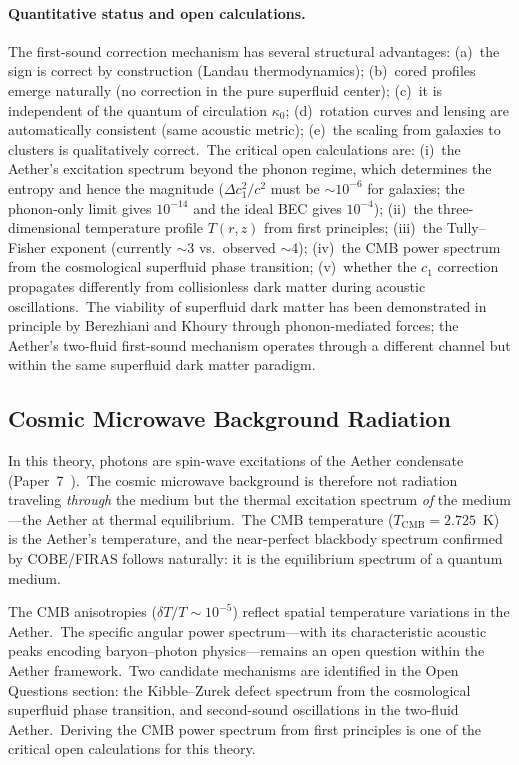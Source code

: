 ﻿\documentclass[12pt,letterpaper]{article}
\begin{document}
\paragraph{Quantitative status and open calculations.}
The first-sound correction mechanism has several structural advantages:
(a)~the sign is correct by construction (Landau thermodynamics);
(b)~cored profiles emerge naturally (no correction in the pure superfluid
center); (c)~it is independent of the quantum of circulation $\kappa_0$;
(d)~rotation curves and lensing are automatically consistent (same
acoustic metric); (e)~the scaling from galaxies to clusters is
qualitatively correct.\ The critical open calculations are:
(i)~the Aether's excitation spectrum beyond the phonon regime, which
determines the entropy and hence the magnitude ($\Delta c_1^2/c^2$ must
be $\sim$$10^{-6}$ for galaxies; the phonon-only limit gives
$10^{-14}$ and the ideal BEC gives $10^{-4}$);
(ii)~the three-dimensional temperature profile $T(r,z)$ from first
principles; (iii)~the Tully--Fisher exponent (currently $\sim$3 vs.\
observed $\sim$4); (iv)~the CMB power spectrum from the cosmological
superfluid phase transition; (v)~whether the $c_1$ correction propagates
differently from collisionless dark matter during acoustic oscillations.\
The viability of superfluid dark matter has been demonstrated in
principle by Berezhiani and Khoury \cite{berezhiani2015} through
phonon-mediated forces; the Aether's two-fluid first-sound mechanism
operates through a different channel but within the same superfluid
dark matter paradigm.


\subsection{Cosmic Microwave Background Radiation}

In this theory, photons are spin-wave excitations of the Aether condensate
(Paper~7~\cite{otto-quantum}).\ The cosmic microwave background is therefore
not radiation traveling \emph{through} the medium but the thermal excitation
spectrum \emph{of} the medium---the Aether at thermal equilibrium.\ The CMB
temperature ($T_{\mathrm{CMB}} = 2.725$~K) is the Aether's temperature, and
the near-perfect blackbody spectrum confirmed by COBE/FIRAS \cite{fixsen1996}
follows naturally: it is the equilibrium spectrum of a quantum medium.

The CMB anisotropies ($\delta T/T \sim 10^{-5}$) reflect spatial temperature
variations in the Aether.\ The specific angular power spectrum---with its
characteristic acoustic peaks encoding baryon--photon physics---remains an open
question within the Aether framework.\ Two candidate mechanisms are identified
in the Open Questions section: the Kibble--Zurek defect spectrum from the
cosmological superfluid phase transition, and second-sound oscillations in the
two-fluid Aether.\ Deriving the CMB power spectrum from first principles is one
of the critical open calculations for this theory.
\end{document}
